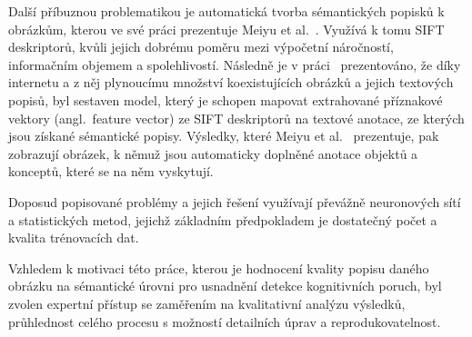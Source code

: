 Další příbuznou problematikou je automatická tvorba sémantických popisků k obrázkům, kterou
ve své práci prezentuje Meiyu et al.~\cite{img_semantic_descr_annotation}.
Využívá k tomu SIFT~\cite{sift} deskriptorů, kvůli jejich dobrému poměru mezi výpočetní náročností, informačním objemem a spolehlivostí.
Následně je v práci~\cite{img_semantic_descr_annotation} prezentováno, že díky internetu a z něj plynoucímu množství koexistujících
obrázků a jejich textových popisů, byl sestaven model, který je schopen mapovat extrahované příznakové vektory (angl.~feature vector)
ze SIFT deskriptorů na textové anotace, ze kterých jsou získané sémantické popisy.
Výsledky, které Meiyu et al.~\cite{img_semantic_descr_annotation} prezentuje, pak zobrazují obrázek,
k němuž jsou automaticky doplněné anotace objektů a konceptů, které se na něm vyskytují.

Doposud popisované problémy a jejich řešení využívají převážně neuronových sítí a statistických metod,
jejichž základním předpokladem je dostatečný počet a kvalita trénovacích dat.

Vzhledem k motivaci této práce, kterou je hodnocení kvality popisu daného obrázku na sémantické úrovni pro
usnadnění detekce kognitivních poruch, byl zvolen expertní přístup se zaměřením na
kvalitativní analýzu výsledků, průhlednost celého procesu s možností detailních úprav a reprodukovatelnost.





